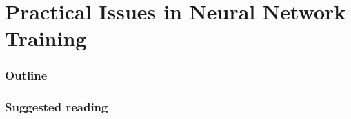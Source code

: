 \renewcommand{\prevpart}{4 }
\renewcommand{\thispart}{5 }
\renewcommand{\nextpart}{6 }
\renewcommand{\thispartname}{Practical Issues in Neural Network Training}

\part{\thispartname}

\section{Outline}




\section{Suggested reading}

